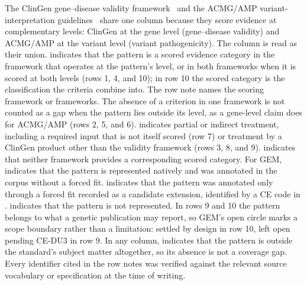The ClinGen gene--disease validity framework~\cite{strande2017} and the
ACMG/AMP variant-interpretation guidelines~\cite{acmg2015} share one
column because they score evidence at complementary levels: ClinGen at the
gene level (gene--disease validity) and ACMG/AMP at the variant level
(variant pathogenicity). The column is read as their union. \cfull{}
indicates that the pattern is a scored evidence category in the framework
that operates at the pattern's level, or in both frameworks when it is
scored at both levels (rows 1, 4, and 10); in row 10 the scored category
is the classification the criteria combine into. The row note names the
scoring framework or frameworks. The absence of a criterion in one
framework is not counted as a gap when the pattern lies outside its level,
as a gene-level claim does for ACMG/AMP (rows 2, 5, and 6). \chalf{}
indicates partial or indirect treatment, including a required input that
is not itself scored (row 7) or treatment by a ClinGen product other than
the validity framework (rows 3, 8, and 9). \cnone{} indicates that neither
framework provides a corresponding scored category. For GEM, \cfull{} indicates that
the pattern is represented natively and was annotated in the corpus without
a forced fit. \cforce{} indicates that the pattern was annotated only
through a forced fit recorded as a candidate extension, identified by a CE
code in . \cnone{} indicates that the pattern
is not represented. In rows 9 and 10 the pattern belongs to what a genetic
publication may report, so GEM's open circle marks a scope boundary rather
than a limitation: settled by design in row 10, left open pending CE-DU3 in
row 9. In any column, \cna{} indicates that the pattern
is outside the standard's subject matter altogether, so its absence is not
a coverage gap.
Every identifier cited in the row notes was verified against the relevant
source vocabulary or specification at the time of writing.

